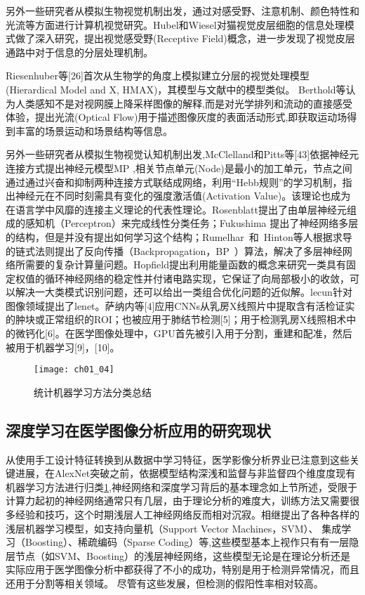 另外一些研究者从模拟生物视觉机制出发，通过对感受野、注意机制、颜色特性和光流等方面进行计算机视觉研究。Hubel和Wiesel\cite{Hubel1962Receptive}对猫视觉皮层细胞的信息处理模式做了深入研究，提出视觉感受野(Receptive Field)概念，进一步发现了视觉皮层通路中对于信息的分层处理机制。{Riesenhuber等\cite{Riesenhuber1999}[26]首次从生物学的角度上模拟建立分层的视觉处理模型(Hierardical Model and X, HMAX)，其模型与文献中的模型类似。 Berthold等\cite{Horn1981}认为人类感知不是对视网膜上降采样图像的解释,而是对光学排列和流动的直接感受体验，提出光流(Optical Flow)用于描述图像灰度的表面活动形式,即获取运动场得到丰富的场景运动和场景结构等信息。

另外一些研究者从模拟生物视觉认知机制出发,McClelland和Pitts等[43]依据神经元连接方式提出神经元模型MP ,相关节点单元(Node)是最小的加工单元，节点之间通过通过兴奋和抑制两种连接方式联结成网络，利用“Hebb规则”的学习机制，指出神经元在不同时刻需具有变化的强度激活值(Activation Value)。该理论也成为在语言学中风靡的连接主义理论的代表性理论。Rosenblatt提出了由单层神经元组成的感知机（Perceptron）来完成线性分类任务；Fukushima 提出了神经网络多层的结构，但是并没有提出如何学习这个结构；Rumelhar 和 Hinton等人根据求导的链式法则提出了反向传播（Backpropagation，BP ）算法，解决了多层神经网络所需要的复杂计算量问题。Hopfield提出利用能量函数的概念来研究一类具有固定权值的循环神经网络的稳定性并付诸电路实现，它保证了向局部极小的收敛，可以解决一大类模式识别问题，还可以给出一类组合优化问题的近似解。lecun针对图像领域提出了lenet。萨纳内等[4]应用CNNs从乳房X线照片中提取含有活检证实的肿块或正常组织的ROI；也被应用于肺结节检测[5]；用于检测乳房X线照相术中的微钙化[6]。在医学图像处理中，GPU首先被引入用于分割，重建和配准，然后被用于机器学习[9]，[10]。 

\begin{figure}[!htbp]
    \centering
    \texttt{[image: ch01\_04]}
    \caption{统计机器学习方法分类总结}
    \label{fig:ch01_04}
\end{figure}

\subsection{深度学习在医学图像分析应用的研究现状}


从使用手工设计特征转换到从数据中学习特征，医学影像分析界业已注意到这些关键进展，在AlexNet突破之前，依据模型结构深浅和监督与非监督四个维度度现有机器学习方法进行归类\ref{fig:ch01_04},神经网络和深度学习背后的基本理念如上节所述，受限于计算力起初的神经网络通常只有几层，由于理论分析的难度大，训练方法又需要很多经验和技巧，这个时期浅层人工神经网络反而相对沉寂。相继提出了各种各样的浅层机器学习模型，如支持向量机（Support Vector Machines，SVM）、 集成学习（Boosting）、稀疏编码（Sparse Coding）等,这些模型基本上视作只有有一层隐层节点（如SVM、Boosting）的浅层神经网络，这些模型无论是在理论分析还是实际应用于医学图像分析中都获得了不小的成功，特别是用于检测异常情况，而且还用于分割等相关领域。 尽管有这些发展，但检测的假阳性率相对较高。

}

